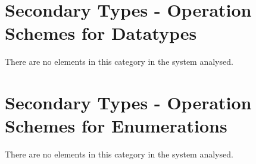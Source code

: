 
\section{Secondary Types - Operation Schemes for Datatypes}
There are no elements in this category in the system analysed.



\section{Secondary Types - Operation Schemes for Enumerations}
There are no elements in this category in the system analysed.


